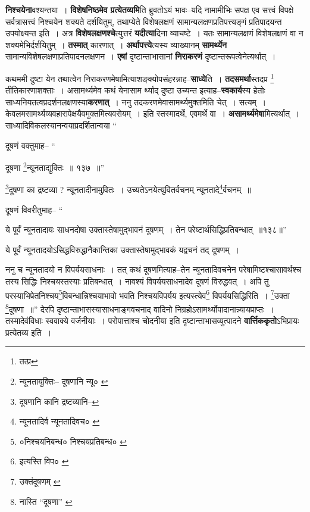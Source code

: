 \documentclass[article,12pt,a4paper]{memoir}
\begin{document}
	  \pstart \textbf{निश्चयेना}वश्यन्तया । \textbf{विशेषनिष्ठमेव प्रत्येतव्यमि}ति ब्रुवतोऽयं भावः--यदि नामामीभिः सपक्ष एव सत्त्वं विपक्षे सर्वत्रासत्त्वं निश्चयेन शक्यते दर्शयितुम्, तथाप्येते विशेषलक्षणं सामान्यलक्षणप्रतिपत्त्यङ्गं प्रतिपादयन्त उपयोक्ष्यन्त इति । अत्र \textbf{विशेषलक्षणश्चे}त्युत्तरं \textbf{यदीत्या}दिना व्याचष्टे । यतः सामान्यलक्षणं विशेषलक्षणं वा न शक्यमेभिर्दर्शयितुम् । \textbf{तस्मात्} कारणात् । \textbf{अर्थापत्त्ये}त्यस्य व्याख्यानम् \textbf{सामर्थ्येन} सामान्यविशेषलक्षणाप्रतिपादनलक्षणन । \textbf{एषां} दृष्टान्ताभासानां \textbf{निराकरणं} दृष्टान्तरूपत्वेनेत्यर्थात् ।
	\pend
      

	  \pstart कथममी दुष्टा येन तथात्वेन निराकरणमेषामित्याशङ्क्योपसंहरन्नाह--\textbf{साध्ये}ति । \textbf{तदसमर्था}स्तदप्र \footnote{तत्प्र} तीतिकारणाशक्ताः । असामर्थ्यमेव कथं येनासाम \leavevmode{}र्थ्याद् दुष्टा उच्यन्त इत्याह--\textbf{स्वकार्य}स्य हेतोः साध्यनियतत्वप्रदर्शनलक्षणस्या\textbf{करणात्} । ननु तदकरणमेवासामर्थ्यमुक्तमिति चेत् । सत्यम् । केवलमसामर्थ्यव्यवहारापेक्षयैवमुक्तमित्यवसेयम् । इति स्तस्मादर्थे, एवमर्थे वा । \textbf{असामर्थ्यमेषा}मित्यर्थात् । साध्यादिविकलस्यानन्वयाप्रदर्शितान्वया    \leavevmode{} “
	  
	दूषणं वक्तुमाह-- “
	  
	दूषणा \footnote{न्यूनतायुक्तिः--\cite{dp-msB} \cite{dp-edP} \cite{dp-edH} दूषणानि न्यू० \cite{dp-edE}}न्यूनताद्युक्तिः ॥ १३७ ॥” 
	  
	\footnote{दूषणानि कानि द्रष्टव्यानि--\cite{dp-edE}}दूषणा का द्रष्टव्या ? न्यूनतादीनामुवितः । उच्यतेऽनयेत्युवितर्वचनम् न्यूनतादे\footnote{न्यूनतादिर्व \cite{dp-msA} \cite{dp-msB} \cite{dp-edP} \cite{dp-edH} न्यूनतादिवच० \cite{dp-edE} \cite{dp-edN}}र्वचनम् ॥ 
	  
	दूषणं विवरीतुमाह-- “
	  
	ये पूर्वं न्यूनतादायः साधनदोषा उक्तास्तेषामुद्भावनं दूषणम् । तेन परेष्टार्थसिद्धिप्रतिबन्धात् ॥१३८॥” 
	  
	ये पूर्वं न्यूनतादयोऽसिद्धविरुद्धानैकान्तिका उक्तास्तेषामुद्भावकं यद्वचनं तद् दूषणम् । 
	  
	ननु च न्यूनतादयो न विपर्ययसाधनाः । तत् कथं दूषणमित्याह--तेन न्यूनतादिवचनेन परेषामिष्टश्चासावर्थश्च तस्य सिद्धिः निश्चयस्तस्याः प्रतिबन्धात् । नावश्यं विपर्ययसाधनादेव दूषणं विरुद्धवत् । अपि तु परस्याभिप्रेतनिश्चय\footnote{०निश्चयनिबन्ध० \cite{dp-msA} \cite{dp-msB} \cite{dp-msC} \cite{dp-msD} \cite{dp-edP} \cite{dp-edH} \cite{dp-edN} निश्चयप्रतिबन्ध० \cite{dp-edE}}विबन्धान्निश्चयाभावो भवति निश्चयविपर्यय इत्यस्त्येव\footnote{इत्यस्ति विप० \cite{dp-msA} \cite{dp-edP} \cite{dp-edH} \cite{dp-edE}} विपर्ययसिद्धिरिति । \footnote{उक्तंदूषणम् \cite{dp-edE}}उक्ता \footnote{नास्ति “दूषणा” \cite{dp-msA} \cite{dp-msB} \cite{dp-edP} \cite{dp-edH}}दूषणा ॥” देरपि दृष्टान्ताभासस्यासाधनाङ्गवचनाद् वादिनो निग्रहोऽसामर्थ्योपादानान्न्यायप्राप्तः । तस्मादेवंविधाः स्ववाक्ये वर्जनीयाः । परोपात्ताश्च चोदनीया इति दृष्टान्ताभासव्युत्पादने \textbf{वार्त्तिककृतो}ऽभिप्रायः प्रत्येतव्य इति ।
	\pend
      
\end{document}
